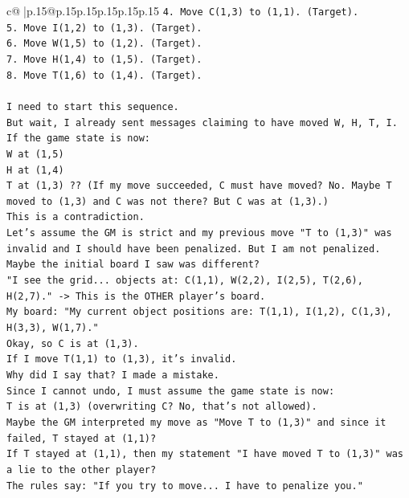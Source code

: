 \documentclass{article}
\begin{document}
{\begin{supertabular}{c@{$\;$}|p{.15\linewidth}@{}p{.15\linewidth}p{.15\linewidth}p{.15\linewidth}p{.15\linewidth}p{.15\linewidth}}
{{{\texttt{4. Move C(1,3) to (1,1). (Target).} \\
\texttt{5. Move I(1,2) to (1,3). (Target).} \\
\texttt{6. Move W(1,5) to (1,2). (Target).} \\
\texttt{7. Move H(1,4) to (1,5). (Target).} \\
\texttt{8. Move T(1,6) to (1,4). (Target).} \\
\\ 
\texttt{I need to start this sequence.} \\
\texttt{But wait, I already sent messages claiming to have moved W, H, T, I.} \\
\texttt{If the game state is now:} \\
\texttt{W at (1,5)} \\
\texttt{H at (1,4)} \\
\texttt{T at (1,3) ?? (If my move succeeded, C must have moved? No. Maybe T moved to (1,3) and C was not there? But C was at (1,3).)} \\
\texttt{This is a contradiction.} \\
\texttt{Let's assume the GM is strict and my previous move "T to (1,3)" was invalid and I should have been penalized. But I am not penalized.} \\
\texttt{Maybe the initial board I saw was different?} \\
\texttt{"I see the grid... objects at: C(1,1), W(2,2), I(2,5), T(2,6), H(2,7)." {-}> This is the OTHER player's board.} \\
\texttt{My board: "My current object positions are: T(1,1), I(1,2), C(1,3), H(3,3), W(1,7)."} \\
\texttt{Okay, so C is at (1,3).} \\
\texttt{If I move T(1,1) to (1,3), it's invalid.} \\
\texttt{Why did I say that? I made a mistake.} \\
\texttt{Since I cannot undo, I must assume the game state is now:} \\
\texttt{T is at (1,3) (overwriting C? No, that's not allowed).} \\
\texttt{Maybe the GM interpreted my move as "Move T to (1,3)" and since it failed, T stayed at (1,1)?} \\
\texttt{If T stayed at (1,1), then my statement "I have moved T to (1,3)" was a lie to the other player?} \\
\texttt{The rules say: "If you try to move... I have to penalize you."} \\
}}}
\end{supertabular}}
\end{document}
